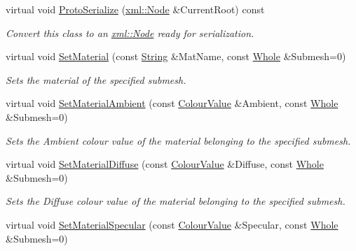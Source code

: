 \begin{DoxyCompactItemize}
virtual void \hyperlink{classMezzanine_1_1WorldObjectGraphicsSettings_a17de93ea24636d2dd1e91cc20ced04a8}{ProtoSerialize} (\hyperlink{classMezzanine_1_1xml_1_1Node}{xml::Node} \&CurrentRoot) const 
\begin{DoxyCompactList}\small\item\em Convert this class to an \hyperlink{classMezzanine_1_1xml_1_1Node}{xml::Node} ready for serialization. \item\end{DoxyCompactList}\item 
virtual void \hyperlink{classMezzanine_1_1WorldObjectGraphicsSettings_a99a72f423f55280da67c4691d220c9a4}{SetMaterial} (const \hyperlink{namespaceMezzanine_acf9fcc130e6ebf08e3d8491aebcf1c86}{String} \&MatName, const \hyperlink{namespaceMezzanine_adcbb6ce6d1eb4379d109e51171e2e493}{Whole} \&Submesh=0)
\begin{DoxyCompactList}\small\item\em Sets the material of the specified submesh. \item\end{DoxyCompactList}\item 
virtual void \hyperlink{classMezzanine_1_1WorldObjectGraphicsSettings_a88597e16ded3a60970c28683c7cb756a}{SetMaterialAmbient} (const \hyperlink{classMezzanine_1_1ColourValue}{ColourValue} \&Ambient, const \hyperlink{namespaceMezzanine_adcbb6ce6d1eb4379d109e51171e2e493}{Whole} \&Submesh=0)
\begin{DoxyCompactList}\small\item\em Sets the Ambient colour value of the material belonging to the specified submesh. \item\end{DoxyCompactList}\item 
virtual void \hyperlink{classMezzanine_1_1WorldObjectGraphicsSettings_a255ca816569198a3c7a6af188b26bf72}{SetMaterialDiffuse} (const \hyperlink{classMezzanine_1_1ColourValue}{ColourValue} \&Diffuse, const \hyperlink{namespaceMezzanine_adcbb6ce6d1eb4379d109e51171e2e493}{Whole} \&Submesh=0)
\begin{DoxyCompactList}\small\item\em Sets the Diffuse colour value of the material belonging to the specified submesh. \item\end{DoxyCompactList}\item 
virtual void \hyperlink{classMezzanine_1_1WorldObjectGraphicsSettings_adec80c34be2baa2a3eaa9605d125734f}{SetMaterialSpecular} (const \hyperlink{classMezzanine_1_1ColourValue}{ColourValue} \&Specular, const \hyperlink{namespaceMezzanine_adcbb6ce6d1eb4379d109e51171e2e493}{Whole} \&Submesh=0)

\end{DoxyCompactItemize}
